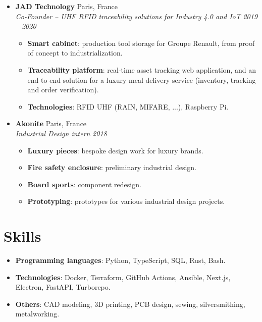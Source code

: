 \documentclass[a4paper,11pt]{article}
\newcommand{\entry}[4]{%
\item \textbf{#1} \hfill #2 \\
\textit{\small #3} \hfill \textit{\small #4}}
\newenvironment{entries}{
\begin{itemize}[leftmargin=1.2em, itemsep=4pt, parsep=0pt, topsep=0pt]}{
\end{itemize}}
\newenvironment{details}{
\begin{itemize}[label=$\circ$, leftmargin=1.5em, itemsep=0pt, parsep=0pt, topsep=2pt]\small}{
\end{itemize}}
\begin{document}
\begin{entries}
  \entry{JAD Technology}{Paris, France}{Co-Founder -- UHF RFID traceability solutions for
  Industry 4.0 and IoT}{2019 -- 2020}
  \begin{details}
  \item \textbf{Smart cabinet}: production tool storage for Groupe Renault, from proof of concept to
    industrialization.
  \item \textbf{Traceability platform}: real-time asset tracking web application, and an end-to-end
    solution for a luxury meal delivery service (inventory, tracking and order verification).
  \item \textbf{Technologies}: RFID UHF (RAIN, MIFARE, ...), Raspberry Pi.
  \end{details}

  \entry{Akonite}{Paris, France}{Industrial Design intern}{2018}
  \begin{details}
  \item \textbf{Luxury pieces}: bespoke design work for luxury brands.
  \item \textbf{Fire safety enclosure}: preliminary industrial design.
  \item \textbf{Board sports}: component redesign.
  \item \textbf{Prototyping}: prototypes for various industrial design projects.
  \end{details}
\end{entries}

\section{Skills}
\begin{entries}
\item \textbf{Programming languages}: Python, TypeScript, SQL, Rust, Bash.
\item \textbf{Technologies}: Docker, Terraform, GitHub Actions, Ansible, Next.js,
  Electron, FastAPI, Turborepo.
\item \textbf{Others}: CAD modeling, 3D printing, PCB design, sewing, silversmithing,
  metalworking.
\end{entries}
\end{document}
